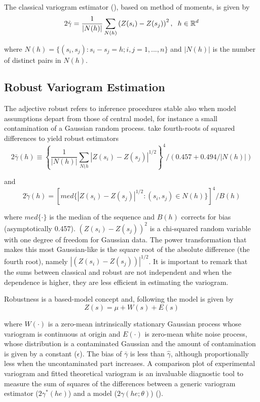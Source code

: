 \documentclass[
  12pt]{article}
\begin{document}
The classical variogram estimator (\citet{mat:1962}), based on method of
moments, is given by\\
\[2\hat{\gamma}=\frac{1}{|N(h)|}\sum_{N(h)}\left(Z(s_i)-Z(s_j)\right)^2, \hspace{2mm} h\in \mathbb{R}^d\]

where \(N(h)=\{(s_i,s_j):s_i-s_j=h; i,j=1,...,n\}\) and \(|N(h)|\) is
the number of distinct pairs in \(N(h)\).

\subsection{Robust Variogram
Estimation}\label{robust-variogram-estimation}

The adjective robust refers to inference procedures stable also when
model assumptions depart from those of central model, for instance a
small contamination of a Gaussian random process. \citet{cre:1980} take
fourth-roots of squared differences to yield robust estimators\\
\[2\bar{\gamma}(h)\equiv\left\{\frac{1}{|N(h)|}\sum_{N(h}|Z(s_i)-Z(s_j)|^{1/2}\right\}^4/(0.457+0.494/|N(h)|)\]

and
\[2\tilde{\gamma}(h)=[med\{|Z(s_i)-Z(s_j)|^{1/2}:(s_i,s_j) \in N(h)\}]^4/B(h)\]

where \(med\{\cdot\}\) is the median of the sequence and \(B(h)\)
corrects for bias (asymptotically 0.457). \((Z(s_i)-Z(s_j))^2\) is a
chi-squared random variable with one degree of freedom for Gaussian
data. The power transformation that makes this most Gaussian-like is the
square root of the absolute difference (the fourth root), namely
\(|(Z(s_i)-Z(s_j))|^{1/2}\). It is important to remark that the sums
between classical and robust are not independent and when the dependence
is higher, they are less efficient in estimating the variogram.

Robustness is a based-model concept and, following \citet{haw:1984} the
model is given by\\
\[Z(s)=\mu+W(s)+E(s)\]

where \(W(\cdot)\) is a zero-mean intrinsically stationary Gaussian
process whose variogram is continuous at origin and \(E(\cdot)\) is
zero-mean white noise process, whose distribution is a contaminated
Gaussian and the amount of contamination is given by a constant
(\(\epsilon\)). The bias of \(\bar{\gamma}\) is less than
\(\hat{\gamma}\), although proportionally less when the uncontaminated
part increases. A comparison plot of experimental variogram and fitted
theoretical variogram is an invaluable diagnostic tool to measure the
sum of squares of the differences between a generic variogram estimator
(\(2\gamma^{*}(he)\)) and a model (\(2\gamma(he;\theta)\))
(\citet{haw:1984}).
\end{document}
